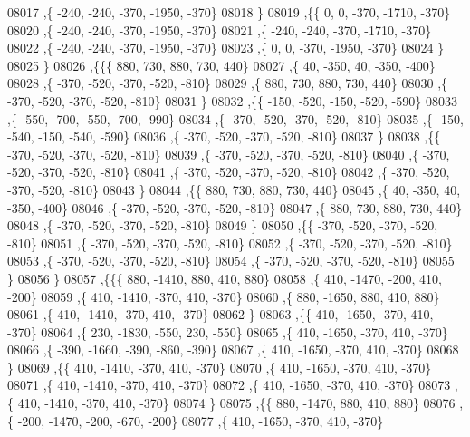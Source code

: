 \begin{DoxyCode}
08017     ,\{  -240,  -240,  -370, -1950,  -370\}
08018     \}
08019    ,\{\{     0,     0,  -370, -1710,  -370\}
08020     ,\{  -240,  -240,  -370, -1950,  -370\}
08021     ,\{  -240,  -240,  -370, -1710,  -370\}
08022     ,\{  -240,  -240,  -370, -1950,  -370\}
08023     ,\{     0,     0,  -370, -1950,  -370\}
08024     \}
08025    \}
08026   ,\{\{\{   880,   730,   880,   730,   440\}
08027     ,\{    40,  -350,    40,  -350,  -400\}
08028     ,\{  -370,  -520,  -370,  -520,  -810\}
08029     ,\{   880,   730,   880,   730,   440\}
08030     ,\{  -370,  -520,  -370,  -520,  -810\}
08031     \}
08032    ,\{\{  -150,  -520,  -150,  -520,  -590\}
08033     ,\{  -550,  -700,  -550,  -700,  -990\}
08034     ,\{  -370,  -520,  -370,  -520,  -810\}
08035     ,\{  -150,  -540,  -150,  -540,  -590\}
08036     ,\{  -370,  -520,  -370,  -520,  -810\}
08037     \}
08038    ,\{\{  -370,  -520,  -370,  -520,  -810\}
08039     ,\{  -370,  -520,  -370,  -520,  -810\}
08040     ,\{  -370,  -520,  -370,  -520,  -810\}
08041     ,\{  -370,  -520,  -370,  -520,  -810\}
08042     ,\{  -370,  -520,  -370,  -520,  -810\}
08043     \}
08044    ,\{\{   880,   730,   880,   730,   440\}
08045     ,\{    40,  -350,    40,  -350,  -400\}
08046     ,\{  -370,  -520,  -370,  -520,  -810\}
08047     ,\{   880,   730,   880,   730,   440\}
08048     ,\{  -370,  -520,  -370,  -520,  -810\}
08049     \}
08050    ,\{\{  -370,  -520,  -370,  -520,  -810\}
08051     ,\{  -370,  -520,  -370,  -520,  -810\}
08052     ,\{  -370,  -520,  -370,  -520,  -810\}
08053     ,\{  -370,  -520,  -370,  -520,  -810\}
08054     ,\{  -370,  -520,  -370,  -520,  -810\}
08055     \}
08056    \}
08057   ,\{\{\{   880, -1410,   880,   410,   880\}
08058     ,\{   410, -1470,  -200,   410,  -200\}
08059     ,\{   410, -1410,  -370,   410,  -370\}
08060     ,\{   880, -1650,   880,   410,   880\}
08061     ,\{   410, -1410,  -370,   410,  -370\}
08062     \}
08063    ,\{\{   410, -1650,  -370,   410,  -370\}
08064     ,\{   230, -1830,  -550,   230,  -550\}
08065     ,\{   410, -1650,  -370,   410,  -370\}
08066     ,\{  -390, -1660,  -390,  -860,  -390\}
08067     ,\{   410, -1650,  -370,   410,  -370\}
08068     \}
08069    ,\{\{   410, -1410,  -370,   410,  -370\}
08070     ,\{   410, -1650,  -370,   410,  -370\}
08071     ,\{   410, -1410,  -370,   410,  -370\}
08072     ,\{   410, -1650,  -370,   410,  -370\}
08073     ,\{   410, -1410,  -370,   410,  -370\}
08074     \}
08075    ,\{\{   880, -1470,   880,   410,   880\}
08076     ,\{  -200, -1470,  -200,  -670,  -200\}
08077     ,\{   410, -1650,  -370,   410,  -370\}

\end{DoxyCode}
